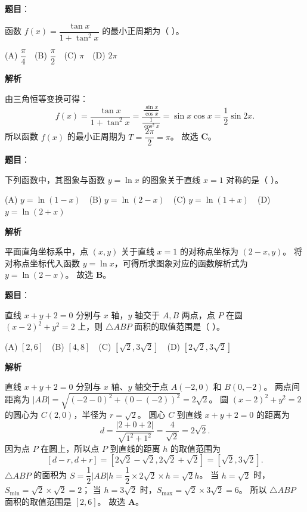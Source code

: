 \begin{answer}

\textbf{题目}：

函数 $f(x) = \dfrac{\tan x}{1 + \tan^2 x}$ 的最小正周期为（ ）。

(A) $\dfrac\pi4$　(B) $\dfrac\pi2$　(C) $\pi$　(D) $2\pi$

\textbf{解析}

由三角恒等变换可得：
\nopagebreak[4]
\[f(x) = \dfrac{\tan x}{1 + \tan^2 x} = \dfrac{\frac{\sin x}{\cos x}}{\frac{1}{\cos^2 x}} = \sin x\cos x = \dfrac12\sin 2x.\]
所以函数 $f(x)$ 的最小正周期为 $T = \dfrac{2\pi}{2} = \pi$。
故选 \textbf{C}。


\end{answer}
\begin{answer}

\textbf{题目}：

下列函数中，其图象与函数 $y = \ln x$ 的图象关于直线 $x = 1$ 对称的是（ ）。

(A) $y = \ln(1 - x)$　(B) $y = \ln(2 - x)$　(C) $y = \ln(1 + x)$　(D) $y = \ln(2 + x)$

\textbf{解析}

平面直角坐标系中，点 $(x, y)$ 关于直线 $x = 1$ 的对称点坐标为 $(2 - x, y)$。
将对称点坐标代入函数 $y = \ln x$，可得所求图象对应的函数解析式为 $y = \ln(2 - x)$。
故选 \textbf{B}。


\end{answer}
\begin{answer}

\textbf{题目}：

直线 $x + y + 2 = 0$ 分别与 $x$ 轴，$y$ 轴交于 $A, B$ 两点，点 $P$ 在圆 $(x - 2)^2 + y^2 = 2$ 上，则 $\triangle ABP$ 面积的取值范围是（ ）。

(A) $[2, 6]$　(B) $[4, 8]$　(C) $[\sqrt2, 3\sqrt2]$　(D) $[2\sqrt2, 3\sqrt2]$

\textbf{解析}

直线 $x + y + 2 = 0$ 分别与 $x$ 轴、$y$ 轴交于点 $A(-2, 0)$ 和 $B(0, -2)$。
两点间距离为 $|AB| = \sqrt{(-2 - 0)^2 + (0 - (-2))^2} = 2\sqrt2$。
圆 $(x - 2)^2 + y^2 = 2$ 的圆心为 $C(2, 0)$，半径为 $r = \sqrt2$。
圆心 $C$ 到直线 $x + y + 2 = 0$ 的距离为
\nopagebreak[4]
\[d = \dfrac{|2 + 0 + 2|}{\sqrt{1^2 + 1^2}} = \dfrac{4}{\sqrt2} = 2\sqrt2.\]
因为点 $P$ 在圆上，所以点 $P$ 到直线的距离 $h$ 的取值范围为
\nopagebreak[4]
\[[d - r, d + r] = [2\sqrt2 - \sqrt2, 2\sqrt2 + \sqrt2] = [\sqrt2, 3\sqrt2].\]
$\triangle ABP$ 的面积为 $S = \dfrac12|AB|h = \dfrac12\times 2\sqrt2\times h = \sqrt2 h$。
当 $h = \sqrt2$ 时，$S_{\min} = \sqrt2\times\sqrt2 = 2$；
当 $h = 3\sqrt2$ 时，$S_{\max} = \sqrt2\times 3\sqrt2 = 6$。
所以 $\triangle ABP$ 面积的取值范围是 $[2, 6]$。
故选 \textbf{A}。


\end{answer}
